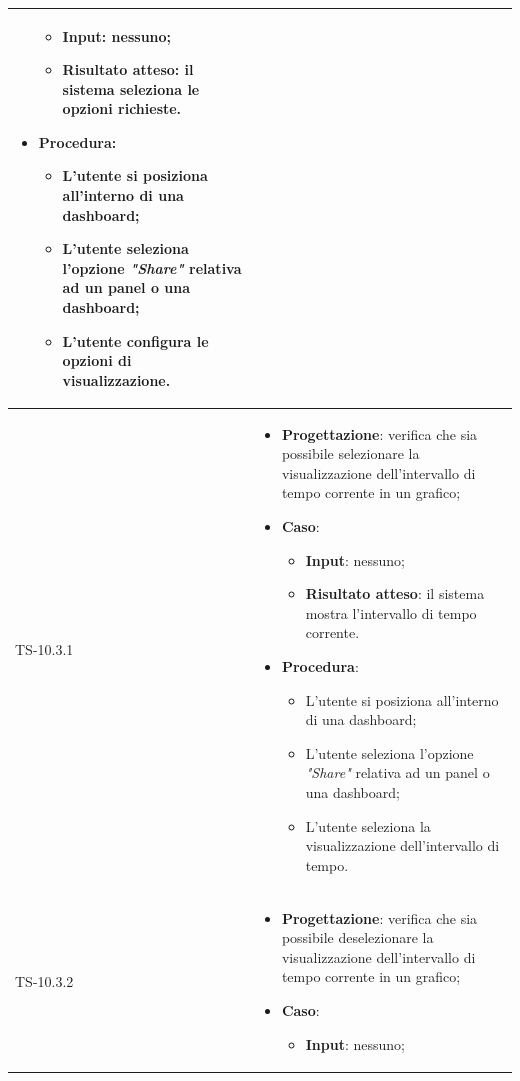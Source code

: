 \begin{longtable}{|C{2.5cm}|C{13cm}|}
\begin{itemize}
	\begin{itemize}
		\item \textbf{Input}: nessuno;
		\item \textbf{Risultato atteso}: il sistema seleziona le opzioni richieste.
	\end{itemize}
	\item \textbf{Procedura}:
	\begin{itemize}
		\item L'utente si posiziona all'interno di una dashboard;
		\item L'utente seleziona l'opzione \emph{"Share"} relativa ad un panel o una dashboard;
		\item L'utente configura le opzioni di visualizzazione.
	\end{itemize} 
\end{itemize}
	\\
	\hline
	{TS-10.3.1} &
\begin{itemize}
	\item \textbf{Progettazione}: verifica che sia  possibile selezionare la
	visualizzazione dell'intervallo di tempo corrente in un grafico;
	\item \textbf{Caso}: 
	\begin{itemize}
		\item \textbf{Input}: nessuno;
		\item \textbf{Risultato atteso}: il sistema mostra l'intervallo di tempo corrente.
	\end{itemize}
	\item \textbf{Procedura}:
	\begin{itemize}
		\item L'utente si posiziona all'interno di una dashboard;
		\item L'utente seleziona l'opzione \emph{"Share"} relativa ad un panel o una dashboard;
		\item L'utente seleziona la visualizzazione dell'intervallo di tempo.
	\end{itemize} 
\end{itemize}
	  \\
	\hline
	{TS-10.3.2} &
\begin{itemize}
	\item \textbf{Progettazione}: verifica che sia possibile deselezionare la
	visualizzazione dell'intervallo di tempo corrente in un grafico;
	\item \textbf{Caso}: 
	\begin{itemize}
		\item \textbf{Input}: nessuno;

\end{itemize}
\end{itemize}
\end{longtable}
